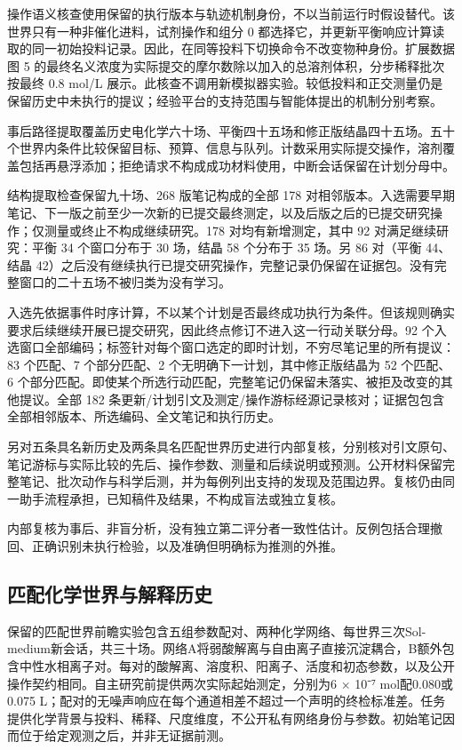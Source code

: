 \documentclass[10pt,a4paper]{article}
\begin{document}
操作语义核查使用保留的执行版本与轨迹机制身份，不以当前运行时假设替代。该世界只有一种非催化进料，试剂操作和组分 0 都选择它，并更新平衡响应计算读取的同一初始投料记录。因此，在同等投料下切换命令不改变物种身份。扩展数据图 5 的最终名义浓度为实际提交的摩尔数除以加入的总溶剂体积，分步稀释批次按最终 0.8 mol/L 展示。此核查不调用新模拟器实验。较低投料和正交测量仍是保留历史中未执行的提议；经验平台的支持范围与智能体提出的机制分别考察。

事后路径提取覆盖历史电化学六十场、平衡四十五场和修正版结晶四十五场。五十个世界内条件比较保留目标、预算、信息与队列。计数采用实际提交操作，溶剂覆盖包括再悬浮添加；拒绝请求不构成成功材料使用，中断会话保留在计划分母中。

结构提取检查保留九十场、268 版笔记构成的全部 178 对相邻版本。入选需要早期笔记、下一版之前至少一次新的已提交最终测定，以及后版之后的已提交研究操作；仅测量或终止不构成继续研究。178 对均有新增测定，其中 92 对满足继续研究：平衡 34 个窗口分布于 30 场，结晶 58 个分布于 35 场。另 86 对（平衡 44、结晶 42）之后没有继续执行已提交研究操作，完整记录仍保留在证据包。没有完整窗口的二十五场不被归类为没有学习。

入选先依据事件时序计算，不以某个计划是否最终成功执行为条件。但该规则确实要求后续继续开展已提交研究，因此终点修订不进入这一行动关联分母。92 个入选窗口全部编码；标签针对每个窗口选定的即时计划，不穷尽笔记里的所有提议：83 个匹配、7 个部分匹配、2 个无明确下一计划，其中修正版结晶为 52 个匹配、6 个部分匹配。即使某个所选行动匹配，完整笔记仍保留未落实、被拒及改变的其他提议。全部 182 条更新/计划引文及测定/操作游标经源记录核对；证据包包含全部相邻版本、所选编码、全文笔记和执行历史。

另对五条具名新历史及两条具名匹配世界历史进行内部复核，分别核对引文原句、笔记游标与实际比较的先后、操作参数、测量和后续说明或预测。公开材料保留完整笔记、批次动作与科学后测，并为每例列出支持的发现及范围边界。复核仍由同一助手流程承担，已知稿件及结果，不构成盲法或独立复核。

内部复核为事后、非盲分析，没有独立第二评分者一致性估计。反例包括合理撤回、正确识别未执行检验，以及准确但明确标为推测的外推。

\subsection{匹配化学世界与解释历史}\label{ux5339ux914dux5316ux5b66ux4e16ux754cux4e0eux89e3ux91caux5386ux53f2}

保留的匹配世界前瞻实验包含五组参数配对、两种化学网络、每世界三次Sol-medium新会话，共三十场。网络A将弱酸解离与自由离子直接沉淀耦合，B额外包含中性水相离子对。每对的酸解离、溶度积、阳离子、活度和初态参数，以及公开操作契约相同。自主研究前提供两次实际起始测定，分别为6 × 10⁻⁷ mol配0.080或0.075 L；配对的无噪声响应在每个通道相差不超过一个声明的终检标准差。任务提供化学背景与投料、稀释、尺度维度，不公开私有网络身份与参数。初始笔记因而位于给定观测之后，并非无证据前测。
\end{document}
